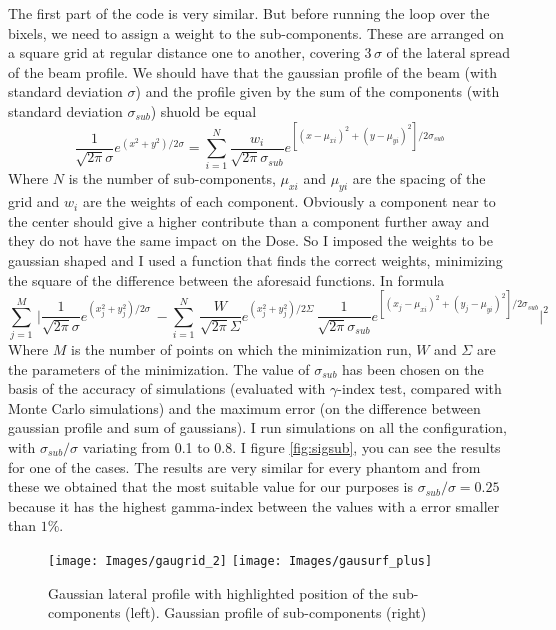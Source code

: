 \documentclass[12pt, a4paper, twoside]{book}
\begin{document}
The first part of the code is very similar. But before running the loop over the bixels, we need to assign a weight to the sub-components. These are arranged on a square grid at regular distance one to another, covering $3\,\sigma$ of the lateral spread of the beam profile. 
We should have that the gaussian profile of the beam (with standard deviation $\sigma$) and the profile given by the sum of the components (with standard deviation $\sigma_{sub}$) shuold be equal
\[
\frac{1}{\sqrt{2 \pi}\sigma}e^{(x^2+y^2)/2\sigma} = \sum_{i=1}^N \frac{w_i}{\sqrt{2 \pi}\sigma_{sub}}e^{[(x-\mu_{xi})^2+(y-\mu_{yi})^2]/2\sigma_{sub}}
\]
Where $N$ is the number of sub-components, $\mu_{xi}$ and $\mu_{yi}$ are the spacing of the grid and $w_i$ are the weights of each component.
Obviously a component near to the center should give a higher contribute than a component further away and they do not have the same impact on the Dose. So I imposed the weights to be gaussian shaped and I used a function that finds the correct weights, minimizing the square of the difference between the aforesaid functions.
In formula
\[
\sum^M_{j=1}\, \bigg|\frac{1}{\sqrt{2\pi}\sigma}e^{(x_j^2+y_j^2)/2\sigma}\, - \sum^N_{i=1} \,\frac{W}{\sqrt{2\pi}\Sigma}e^{(x_j^2+y_j^2)/2\Sigma} \,\frac{1}{\sqrt{2\pi}\sigma_{sub}}e^{[(x_j-\mu_{xi})^2+(y_j-\mu_{yi})^2]/2\sigma_{sub}} \bigg|^2
\]
Where $M$ is the number of points on which the minimization run, $W$ and $\Sigma$ are the parameters of the minimization.
The value of $\sigma_{sub}$ has been chosen on the basis of the accuracy of simulations (evaluated with $\gamma$-index test, compared with Monte Carlo simulations) and the maximum error (on the difference between gaussian profile and sum of gaussians). I run simulations on all the configuration, with $\sigma_{sub}/\sigma$ variating from 0.1 to 0.8. I figure \ref{fig:sigsub}, you can see the results for one of the cases. The results are very similar for every phantom and from these we obtained that the most suitable value for our purposes is $\sigma_{sub}/\sigma=0.25$ because it has the highest gamma-index between the values with a error smaller than $1\%$.
\begin{figure}[t]
{\texttt{[image: Images/gaugrid\_2]}}
{\texttt{[image: Images/gausurf\_plus]}}
\caption{Gaussian lateral profile with highlighted position of the sub-components (left). Gaussian profile of sub-components (right)}
\label{fig:gaugrid}
\end{figure}

\end{document}

